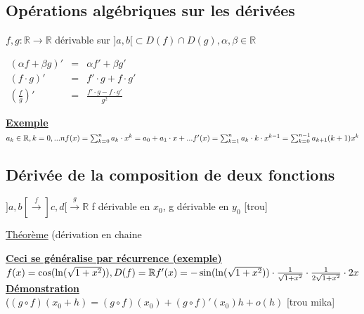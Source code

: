 \documentclass[12pt,a4paper]{article}
\newcommand{\evid}[1]{\textbf{\underline{#1}}}
\newcommand{\Xo}{\ensuremath{x_0}}
\newcommand{\R}{\ensuremath{\mathbb{R}} }
\newcommand{\rtor}{\ensuremath{\R \to \R} }
\newcommand{\Theoreme}{\underline{Théorème} }
\begin{document}
{\subsection{Opérations algébriques sur les dérivées}
$f,g : \rtor$ dérivable sur $]a,b[ \subset D(f) \cap D(g), \alpha, \beta \in \R$

\begin{boite}
$\begin{array}{ccc}
(\alpha f + \beta g)' & = & \alpha f' + \beta g'\\
(f\cdot g)' & = & f'\cdot g + f\cdot  g'\\
\left(\frac{f}{g}\right)' & = & \frac{f'\cdot g - f\cdot g'}{g^2}
\end{array}$
\end{boite}

\evid{Exemple} $a_k \in \R, k = 0,...n\\
f(x) = \sum^n_{k=0} a_k\cdot x^k = a_0 + a_1\cdot x +...\\
f'(x) = \sum^n_{k=1} a_k\cdot k \cdot x^{k-1} = \sum^{n-1}_{k=0}a_{k+1}(k+1)x^k$
\subsection{Dérivée de la composition de deux fonctions}
$]a,b[ \overset{f}{\to} ]c,d[ \overset{g}{\to}\R$ f dérivable en \Xo, g dérivable en $y_0$
[trou]\\
\begin{boite}
\Theoreme (dérivation en chaine\\
\end{boite}
\evid{Ceci se généralise par récurrence (exemple)}\\
$f(x) = \cos(\ln(\sqrt{1+x^2})), D(f) = \R\\
f'(x) = -\sin(\ln(\sqrt{1+x^2}))\cdot \frac{1}{\sqrt{1+x^2}} \cdot \frac{1}{2\sqrt{1+x^2}} \cdot 2x$\\
\evid{Démonstration}\\
($(g \circ f)(x_0 + h) = (g \circ f)(x_0) + (g \circ f)' (x_0) h +o(h)$
[trou mika]

}
\end{document}
